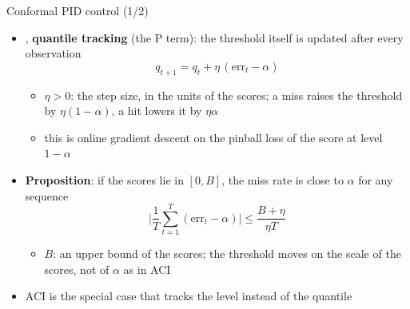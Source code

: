 \begin{frame}{Conformal PID control (1/2)}
\itemsize{\small}
\begin{itemize}
    \item {}, \textbf{quantile tracking} (the P term): the threshold itself is updated after every observation \[ q_{t+1} = q_t + \eta\,(\mathrm{err}_t - \alpha) \]
    \begin{itemize}
        \item $\eta > 0$: the step size, in the units of the scores; a miss raises the threshold by $\eta(1 - \alpha)$, a hit lowers it by $\eta\alpha$
        \item this is online gradient descent on the pinball loss of the score at level $1 - \alpha$
    \end{itemize}
    \item \textbf{Proposition}: if the scores lie in $[0, B]$, the miss rate is close to $\alpha$ for any sequence \[ \Big|\frac1T\sum_{t=1}^T(\mathrm{err}_t - \alpha)\Big| \le \frac{B + \eta}{\eta T} \]
    \begin{itemize}
        \item $B$: an upper bound of the scores; the threshold moves on the scale of the scores, not of $\alpha$ as in ACI
    \end{itemize}
    \item ACI is the special case that tracks the level instead of the quantile
\end{itemize}
\end{frame}

